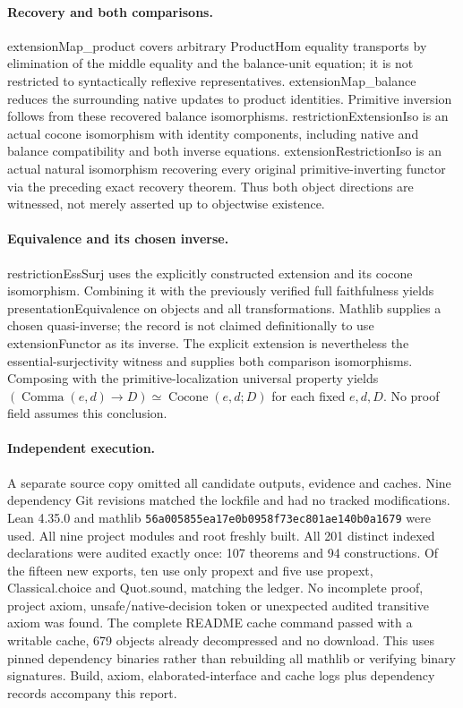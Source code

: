 \documentclass{article}
\begin{document}
\paragraph{Recovery and both comparisons.} extensionMap\_product covers arbitrary ProductHom equality transports by elimination of the middle equality and the balance-unit equation; it is not restricted to syntactically reflexive representatives. extensionMap\_balance reduces the surrounding native updates to product identities. Primitive inversion follows from these recovered balance isomorphisms. restrictionExtensionIso is an actual cocone isomorphism with identity components, including native and balance compatibility and both inverse equations. extensionRestrictionIso is an actual natural isomorphism recovering every original primitive-inverting functor via the preceding exact recovery theorem. Thus both object directions are witnessed, not merely asserted up to objectwise existence.
\paragraph{Equivalence and its chosen inverse.} restrictionEssSurj uses the explicitly constructed extension and its cocone isomorphism. Combining it with the previously verified full faithfulness yields presentationEquivalence on objects and all transformations. Mathlib supplies a chosen quasi-inverse; the record is not claimed definitionally to use extensionFunctor as its inverse. The explicit extension is nevertheless the essential-surjectivity witness and supplies both comparison isomorphisms. Composing with the primitive-localization universal property yields $(\operatorname{Comma}(e,d)\to D)\simeq\operatorname{Cocone}(e,d;D)$ for each fixed $e,d,D$. No proof field assumes this conclusion.
\paragraph{Independent execution.} A separate source copy omitted all candidate outputs, evidence and caches. Nine dependency Git revisions matched the lockfile and had no tracked modifications. Lean 4.35.0 and mathlib \texttt{56a005855ea17e0b0958f73ec801ae140b0a1679} were used. All nine project modules and root freshly built. All 201 distinct indexed declarations were audited exactly once: 107 theorems and 94 constructions. Of the fifteen new exports, ten use only propext and five use propext, Classical.choice and Quot.sound, matching the ledger. No incomplete proof, project axiom, unsafe/native-decision token or unexpected audited transitive axiom was found. The complete README cache command passed with a writable cache, 679 objects already decompressed and no download. This uses pinned dependency binaries rather than rebuilding all mathlib or verifying binary signatures. Build, axiom, elaborated-interface and cache logs plus dependency records accompany this report.
\end{document}
